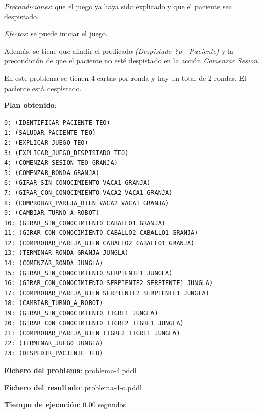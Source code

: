 \documentclass{uc3mpracticas}
\begin{document}
  \vspace{1mm}

    \textit{Precondiciones}: que el juego ya haya sido explicado y que el paciente sea despistado.

    \vspace{1mm}

    \textit{Efectos}: se puede iniciar el juego.


  \vspace{2mm}

  Además, se tiene que añadir el predicado \textit{(Despistado ?p - Paciente)} y la precondición de que el paciente no esté despistado en la acción \textit{Comenzar Sesion}.

  \vspace{3mm}

  En este problema se tienen 4 cartas por ronda y hay un total de 2 rondas. El paciente está despistado.

  \begin{multicols}{2}
    \textbf{Plan obtenido}:

    \begin{lstlisting}
0: (IDENTIFICAR_PACIENTE TEO)
1: (SALUDAR_PACIENTE TEO)
2: (EXPLICAR_JUEGO TEO)
3: (EXPLICAR_JUEGO_DESPISTADO TEO)
4: (COMENZAR_SESION TEO GRANJA)
5: (COMENZAR_RONDA GRANJA)
6: (GIRAR_SIN_CONOCIMIENTO VACA1 GRANJA)
7: (GIRAR_CON_CONOCIMIENTO VACA2 VACA1 GRANJA)
8: (COMPROBAR_PAREJA_BIEN VACA2 VACA1 GRANJA)
9: (CAMBIAR_TURNO_A_ROBOT)
10: (GIRAR_SIN_CONOCIMIENTO CABALLO1 GRANJA)
11: (GIRAR_CON_CONOCIMIENTO CABALLO2 CABALLO1 GRANJA)
12: (COMPROBAR_PAREJA_BIEN CABALLO2 CABALLO1 GRANJA)
13: (TERMINAR_RONDA GRANJA JUNGLA)
14: (COMENZAR_RONDA JUNGLA)
15: (GIRAR_SIN_CONOCIMIENTO SERPIENTE1 JUNGLA)
16: (GIRAR_CON_CONOCIMIENTO SERPIENTE2 SERPIENTE1 JUNGLA)
17: (COMPROBAR_PAREJA_BIEN SERPIENTE2 SERPIENTE1 JUNGLA)
18: (CAMBIAR_TURNO_A_ROBOT)
19: (GIRAR_SIN_CONOCIMIENTO TIGRE1 JUNGLA)
20: (GIRAR_CON_CONOCIMIENTO TIGRE2 TIGRE1 JUNGLA)
21: (COMPROBAR_PAREJA_BIEN TIGRE2 TIGRE1 JUNGLA)
22: (TERMINAR_JUEGO JUNGLA)
23: (DESPEDIR_PACIENTE TEO)
    \end{lstlisting}

    \columnbreak

    \textbf{Fichero del problema}: problema-4.pddl

    \textbf{Fichero del resultado}: problema-4-o.pddl

    \textbf{Tiempo de ejecución}: 0.00 segundos
  \end{multicols}
\end{document}
